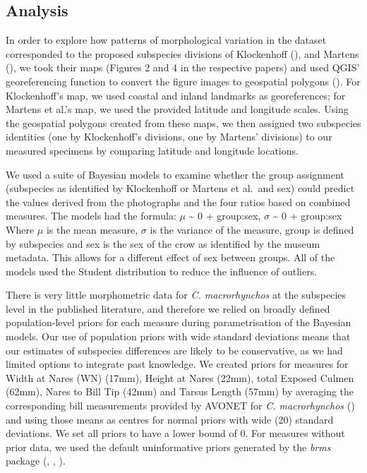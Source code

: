 \documentclass[10pt,a4paper]{article}
\begin{document}
\subsection{Analysis}\label{analysis}

In order to explore how patterns of morphological variation in the dataset corresponded to the proposed subspecies divisions of Klockenhoff (), and Martens (), we took their maps (Figures 2 and 4 in the respective papers) and used QGIS' georeferencing function to convert the figure images to geospatial polygons ().
For Klockenhoff's map, we used coastal and inland landmarks as georeferences; for Martens et al.'s map, we used the provided latitude and longitude scales.
Using the geospatial polygons created from these maps, we then assigned two subspecies identities (one by Klockenhoff's divisions, one by Martens' divisions) to our measured specimens by comparing latitude and longitude locations.

We used a suite of Bayesian models to examine whether the group assignment (subspecies as identified by Klockenhoff or Martens et al.~and sex) could predict the values derived from the photographs and the four ratios based on combined measures.
The models had the formula: \(\mu\) \textasciitilde{} 0 + group:sex, \(\sigma\) \textasciitilde{} 0 + group:sex
Where \(\mu\) is the mean measure, \(\sigma\) is the variance of the measure, group is defined by subspecies and sex is the sex of the crow as identified by the museum metadata.
This allows for a different effect of sex between groups.
All of the models used the Student distribution to reduce the influence of outliers.

There is very little morphometric data for \emph{C. macrorhynchos} at the subspecies level in the published literature, and therefore we relied on broadly defined population-level priors for each measure during parametrisation of the Bayesian models.
Our use of population priors with wide standard deviations means that our estimates of subspecies differences are likely to be conservative, as we had limited options to integrate past knowledge.
We created priors for measures for Width at Nares (WN) (17mm), Height at Nares (22mm), total Exposed Culmen (62mm), Nares to Bill Tip (42mm) and Tarsus Length (57mm) by averaging the corresponding bill measurements provided by AVONET for \emph{C. macrorhynchos} () and using those means as centres for normal priors with wide (20) standard deviations.
We set all priors to have a lower bound of 0.
For measures without prior data, we used the default uninformative priors generated by the \emph{brms} package (, , ).
\end{document}
